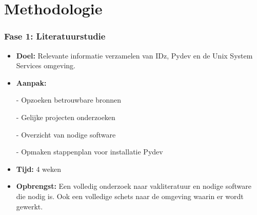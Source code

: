 
\chapter{Methodologie}%
\label{ch:methodologie}


\subsection{Fase 1: Literatuurstudie}
\begin{itemize}
    \item \textbf{Doel:}
    Relevante informatie verzamelen van IDz, Pydev en de Unix System Services omgeving.
    \item \textbf{Aanpak:}
    \item[-] Opzoeken betrouwbare bronnen
    \item[-] Gelijke projecten onderzoeken
    \item[-] Overzicht van nodige software
    \item[-] Opmaken stappenplan voor installatie Pydev
    \item \textbf{Tijd:} 4 weken
    \item \textbf{Opbrengst:}
    Een volledig onderzoek naar vakliteratuur en nodige software die nodig is. Ook een volledige schets naar de omgeving waarin er wordt gewerkt.
\end{itemize}


